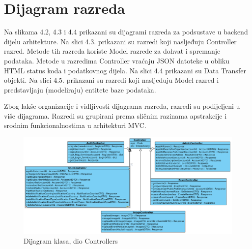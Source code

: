				
	
			\eject
			
		\newpage	
		\section{Dijagram razreda}
		
			
			\textit{}

			Na slikama 4.2, 4.3 i 4.4 prikazani su dijagrami razreda za podsustave u backend dijelu arhitekture. Na slici 4.3. prikazani su razredi koji nasljeđuju Controller razred. Metode tih razreda koriste Model razrede za dohvat i spremanje podataka. Metode u razredima Controller vraćaju JSON datoteke u obliku HTML status koda i podatkovnog dijela. Na slici 4.4 prikazani su Data Transfer objekti. Na slici 4.5. prikazani su razredi koji nasljeđuju Model razred i predstavljaju (modeliraju) entitete baze podataka.
			
			Zbog lakše organizacije i vidljivosti dijagrama razreda, razredi su podijeljeni u više dijagrama. Razredi su grupirani prema sličnim razinama apstrakcije i srodnim funkcionalnostima u arhitekturi MVC.
			
			\begin{figure}[htbp]
				\centering
				\includegraphics[width=1\textwidth]{dijagrami/dijagram_mvc_controllers.png}
				\caption{Dijagram klasa, dio Controllers}
			\label{fig:my_image}
			\end{figure}

